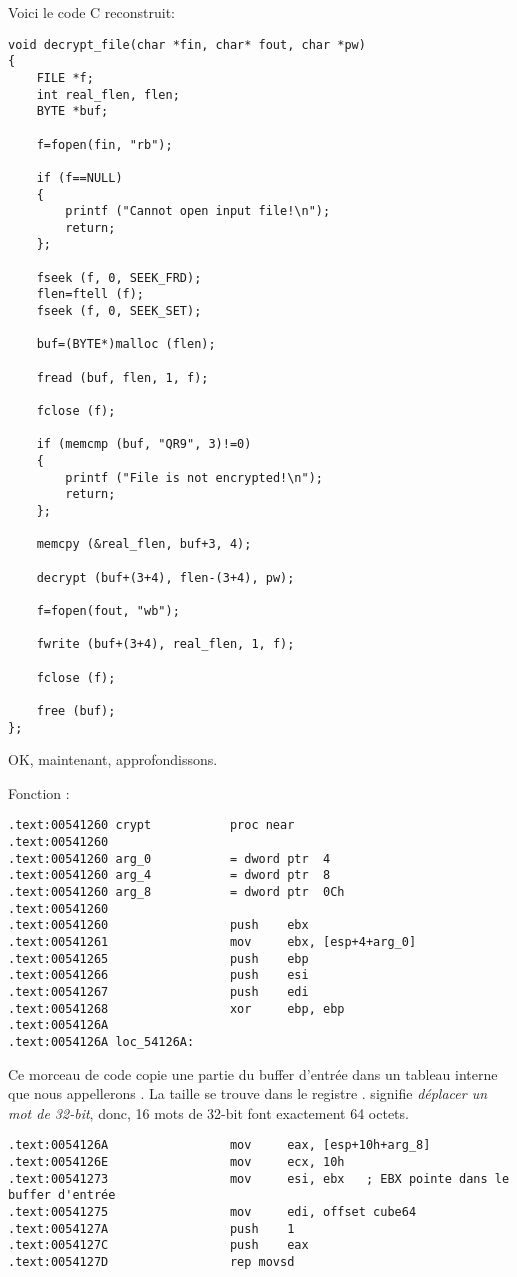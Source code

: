 Voici le code C reconstruit:

\begin{lstlisting}[style=customc]
void decrypt_file(char *fin, char* fout, char *pw)
{
	FILE *f;
	int real_flen, flen;
	BYTE *buf;

	f=fopen(fin, "rb");
	
	if (f==NULL)
	{
		printf ("Cannot open input file!\n");
		return;
	};

	fseek (f, 0, SEEK_FRD);
	flen=ftell (f);
	fseek (f, 0, SEEK_SET);

	buf=(BYTE*)malloc (flen);

	fread (buf, flen, 1, f);

	fclose (f);

	if (memcmp (buf, "QR9", 3)!=0)
	{
		printf ("File is not encrypted!\n");
		return;
	};

	memcpy (&real_flen, buf+3, 4);

	decrypt (buf+(3+4), flen-(3+4), pw);
	
	f=fopen(fout, "wb");

	fwrite (buf+(3+4), real_flen, 1, f);

	fclose (f);

	free (buf);
};
\end{lstlisting}

OK, maintenant, approfondissons.

Fonction :

\begin{lstlisting}[style=customasmx86]
.text:00541260 crypt           proc near
.text:00541260
.text:00541260 arg_0           = dword ptr  4
.text:00541260 arg_4           = dword ptr  8
.text:00541260 arg_8           = dword ptr  0Ch
.text:00541260
.text:00541260                 push    ebx
.text:00541261                 mov     ebx, [esp+4+arg_0]
.text:00541265                 push    ebp
.text:00541266                 push    esi
.text:00541267                 push    edi
.text:00541268                 xor     ebp, ebp
.text:0054126A
.text:0054126A loc_54126A:
\end{lstlisting}

Ce morceau de code copie une partie du buffer d'entrée dans un tableau interne que
nous appellerons .
La taille se trouve dans le registre \ECX.  signifie \emph{déplacer un mot de 32-bit},
donc, 16 mots de 32-bit font exactement 64 octets.

\begin{lstlisting}[style=customasmx86]
.text:0054126A                 mov     eax, [esp+10h+arg_8]
.text:0054126E                 mov     ecx, 10h
.text:00541273                 mov     esi, ebx   ; EBX pointe dans le buffer d'entrée
.text:00541275                 mov     edi, offset cube64
.text:0054127A                 push    1
.text:0054127C                 push    eax
.text:0054127D                 rep movsd
\end{lstlisting}


